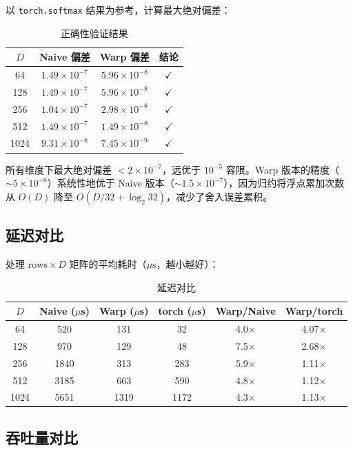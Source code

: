 \documentclass[12pt,a4paper]{ctexart}
\begin{document}
以 \texttt{torch.softmax} 结果为参考，计算最大绝对偏差：

\begin{table}[H]
\centering
\caption{正确性验证结果}
\begin{tabular}{cccc}
\toprule
$D$ & Naive 偏差 & Warp 偏差 & 结论 \\
\midrule
64  & $1.49\times10^{-7}$ & $5.96\times10^{-8}$ & $\checkmark$ \\
128 & $1.49\times10^{-7}$ & $5.96\times10^{-8}$ & $\checkmark$ \\
256 & $1.04\times10^{-7}$ & $2.98\times10^{-8}$ & $\checkmark$ \\
512 & $1.49\times10^{-7}$ & $1.49\times10^{-8}$ & $\checkmark$ \\
1024& $9.31\times10^{-8}$ & $7.45\times10^{-9}$ & $\checkmark$ \\
\bottomrule
\end{tabular}
\end{table}

所有维度下最大绝对偏差 $<2\times10^{-7}$，远优于 $10^{-5}$ 容限。Warp 版本的精度（$\sim5\times10^{-8}$）系统性地优于 Naive 版本（$\sim1.5\times10^{-7}$），因为归约将浮点累加次数从 $O(D)$ 降至 $O(D/32 + \log_2 32)$，减少了舍入误差累积。

\subsection{延迟对比}

处理 $\text{rows} \times D$ 矩阵的平均耗时（$\mu\text{s}$，越小越好）：

\begin{table}[H]
\centering
\caption{延迟对比}
\begin{tabular}{cccccc}
\toprule
$D$ & Naive ($\mu$s) & Warp ($\mu$s) & torch ($\mu$s) & Warp/Naive & Warp/torch \\
\midrule
64   & 520  & 131  & 32   & 4.0$\times$ & 4.07$\times$ \\
128  & 970  & 129  & 48   & 7.5$\times$ & 2.68$\times$ \\
256  & 1840 & 313  & 283  & 5.9$\times$ & 1.11$\times$ \\
512  & 3185 & 663  & 590  & 4.8$\times$ & 1.12$\times$ \\
1024 & 5651 & 1319 & 1172 & 4.3$\times$ & 1.13$\times$ \\
\bottomrule
\end{tabular}
\end{table}

\subsection{吞吐量对比}
\end{document}
